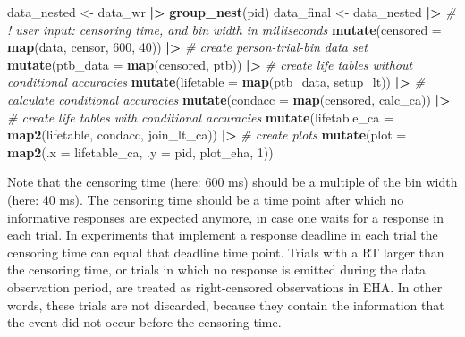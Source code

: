 \documentclass[
  english,
  man, donotrepeattitle,floatsintext]{apa6}
\newenvironment{Shaded}{\begin{snugshade}}{\end{snugshade}}
\newcommand{\AttributeTok}[1]{\textcolor[rgb]{0.13,0.29,0.53}{#1}}
\newcommand{\CommentTok}[1]{\textcolor[rgb]{0.56,0.35,0.01}{\textit{#1}}}
\newcommand{\DecValTok}[1]{\textcolor[rgb]{0.00,0.00,0.81}{#1}}
\newcommand{\FunctionTok}[1]{\textcolor[rgb]{0.13,0.29,0.53}{\textbf{#1}}}
\newcommand{\NormalTok}[1]{#1}
\newcommand{\OtherTok}[1]{\textcolor[rgb]{0.56,0.35,0.01}{#1}}
\newcommand{\SpecialCharTok}[1]{\textcolor[rgb]{0.81,0.36,0.00}{\textbf{#1}}}
\begin{document}
\begin{Shaded}
\begin{Highlighting}[]
\NormalTok{data\_nested }\OtherTok{\textless{}{-}}\NormalTok{ data\_wr }\SpecialCharTok{|\textgreater{}} \FunctionTok{group\_nest}\NormalTok{(pid)}
\NormalTok{data\_final }\OtherTok{\textless{}{-}}\NormalTok{ data\_nested }\SpecialCharTok{|\textgreater{}}
  \CommentTok{\# ! user input: censoring time, and bin width in milliseconds}
  \FunctionTok{mutate}\NormalTok{(}\AttributeTok{censored =} \FunctionTok{map}\NormalTok{(data, censor, }\DecValTok{600}\NormalTok{, }\DecValTok{40}\NormalTok{)) }\SpecialCharTok{|\textgreater{}}
  \CommentTok{\# create person{-}trial{-}bin data set}
  \FunctionTok{mutate}\NormalTok{(}\AttributeTok{ptb\_data =} \FunctionTok{map}\NormalTok{(censored, ptb)) }\SpecialCharTok{|\textgreater{}}
  \CommentTok{\# create life tables without conditional accuracies}
  \FunctionTok{mutate}\NormalTok{(}\AttributeTok{lifetable =} \FunctionTok{map}\NormalTok{(ptb\_data, setup\_lt)) }\SpecialCharTok{|\textgreater{}}
  \CommentTok{\# calculate conditional accuracies}
  \FunctionTok{mutate}\NormalTok{(}\AttributeTok{condacc =} \FunctionTok{map}\NormalTok{(censored, calc\_ca)) }\SpecialCharTok{|\textgreater{}}
  \CommentTok{\# create life tables with conditional accuracies}
  \FunctionTok{mutate}\NormalTok{(}\AttributeTok{lifetable\_ca =} \FunctionTok{map2}\NormalTok{(lifetable, condacc, join\_lt\_ca)) }\SpecialCharTok{|\textgreater{}}
  \CommentTok{\# create plots}
  \FunctionTok{mutate}\NormalTok{(}\AttributeTok{plot =} \FunctionTok{map2}\NormalTok{(}\AttributeTok{.x =}\NormalTok{ lifetable\_ca, }\AttributeTok{.y =}\NormalTok{ pid, plot\_eha, }\DecValTok{1}\NormalTok{))}
\end{Highlighting}
\end{Shaded}

\normalsize

Note that the censoring time (here: 600 ms) should be a multiple of the bin width (here: 40 ms). The censoring time should be a time point after which no informative responses are expected anymore, in case one waits for a response in each trial. In experiments that implement a response deadline in each trial the censoring time can equal that deadline time point. Trials with a RT larger than the censoring time, or trials in which no response is emitted during the data observation period, are treated as right-censored observations in EHA. In other words, these trials are not discarded, because they contain the information that the event did not occur before the censoring time.
\end{document}

